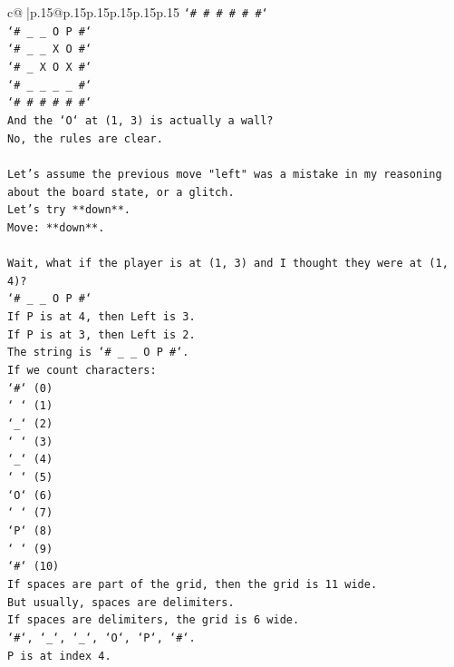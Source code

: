 \documentclass{article}
\begin{document}
{\begin{supertabular}{c@{$\;$}|p{.15\linewidth}@{}p{.15\linewidth}p{.15\linewidth}p{.15\linewidth}p{.15\linewidth}p{.15\linewidth}}
{{{\texttt{`\# \# \# \# \# \#`} \\
\texttt{`\# \_ \_ O P \#`} \\
\texttt{`\# \_ \_ X O \#`} \\
\texttt{`\# \_ X O X \#`} \\
\texttt{`\# \_ \_ \_ \_ \#`} \\
\texttt{`\# \# \# \# \# \#`} \\
\texttt{And the `O` at (1, 3) is actually a wall?} \\
\texttt{No, the rules are clear.} \\
\\ 
\texttt{Let's assume the previous move "left" was a mistake in my reasoning about the board state, or a glitch.} \\
\texttt{Let's try **down**.} \\
\texttt{Move: **down**.} \\
\\ 
\texttt{Wait, what if the player is at (1, 3) and I thought they were at (1, 4)?} \\
\texttt{`\# \_ \_ O P \#`} \\
\texttt{If P is at 4, then Left is 3.} \\
\texttt{If P is at 3, then Left is 2.} \\
\texttt{The string is `\# \_ \_ O P \#`.} \\
\texttt{If we count characters:} \\
\texttt{`\#` (0)} \\
\texttt{` ` (1)} \\
\texttt{`\_` (2)} \\
\texttt{` ` (3)} \\
\texttt{`\_` (4)} \\
\texttt{` ` (5)} \\
\texttt{`O` (6)} \\
\texttt{` ` (7)} \\
\texttt{`P` (8)} \\
\texttt{` ` (9)} \\
\texttt{`\#` (10)} \\
\texttt{If spaces are part of the grid, then the grid is 11 wide.} \\
\texttt{But usually, spaces are delimiters.} \\
\texttt{If spaces are delimiters, the grid is 6 wide.} \\
\texttt{`\#`, `\_`, `\_`, `O`, `P`, `\#`.} \\
\texttt{P is at index 4.} \\
}}}
\end{supertabular}}
\end{document}
